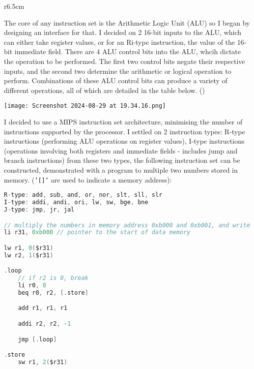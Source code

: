 \needspace{100pt}


\begin{wrapfigure}[10]{r}{6.5cm}
\end{wrapfigure}

The core of any instruction set is the Arithmetic Logic Unit (ALU) so I began by designing an interface for that. I decided on 2 16-bit inputs to the ALU, which can either take register values, or for an Ri-type instruction, the value of the 16-bit immediate field. There are 4 ALU control bits into the ALU, whcih dictate the operation to be performed. The first two control bits negate their respective inputs, and the second two determine the arithmetic or logical operation to perform. Combinations of these ALU control bits can produce a variety of different operations, all of which are detailed in the table below. (\cite{EOCS})

\bigskip

\begin{center}
    \texttt{[image: Screenshot 2024-08-29 at 19.34.16.png]}
\end{center}


I decided to use a MIPS instruction set architecture, minimising the number of instructions supported by the processor. I settled on 2 instruction types: R-type instructions (performing ALU operations on register values), I-type instructions (operations involving both registers and immediate fields - includes jump and branch instructions) from these two types, the following instruction set can be constructed, demonstrated with a program to multiple two numbers stored in memory. (\texttt{'[]'} are used to indicate a memory address):

\begin{lstlisting}[language=C]
R-type: add, sub, and, or, nor, slt, sll, slr
I-type: addi, andi, ori, lw, sw, bge, bne
J-type: jmp, jr, jal

// multiply the numbers in memory address 0xb000 and 0xb001, and write the answer to 0xb002
li r31, 0xb000 // pointer to the start of data memory

lw r1, 0($r31)
lw r2, 1($r31)

.loop
    // if r2 is 0, break
    li r0, 0
    beq r0, r2, [.store]

    add r1, r1, r1

    addi r2, r2, -1

    jmp [.loop]

.store
    sw r1, 2($r31)
\end{lstlisting}

